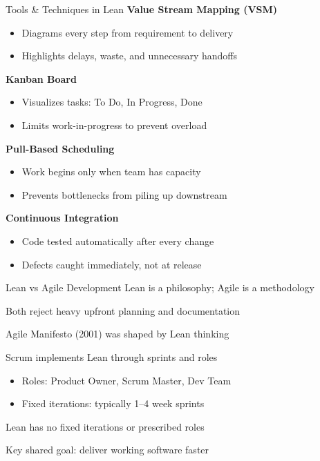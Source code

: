 \documentclass{thapathali}
\begin{document}

\begin{frame}{Tools \& Techniques in Lean}
    \textbf{Value Stream Mapping (VSM)}
    \begin{itemize}
        \item Diagrams every step from requirement to delivery
        \item Highlights delays, waste, and unnecessary handoffs
    \end{itemize}
    \vspace{0.3em}
    
    \textbf{Kanban Board}
    \begin{itemize}
        \item Visualizes tasks: To Do, In Progress, Done
        \item Limits work-in-progress to prevent overload
    \end{itemize}
    \vspace{0.3em}
    
    \textbf{Pull-Based Scheduling}
    \begin{itemize}
        \item Work begins only when team has capacity
        \item Prevents bottlenecks from piling up downstream
    \end{itemize}
    \vspace{0.3em}
    
    \textbf{Continuous Integration}
    \begin{itemize}
        \item Code tested automatically after every change
        \item Defects caught immediately, not at release
    \end{itemize}
\end{frame}

\begin{frame}{Lean vs Agile Development}
    Lean is a philosophy; Agile is a methodology
    \vspace{0.3em}
    
    Both reject heavy upfront planning and documentation
    \vspace{0.3em}
    
    Agile Manifesto (2001) was shaped by Lean thinking
    \vspace{0.3em}
    
    Scrum implements Lean through sprints and roles
    \begin{itemize}
        \item Roles: Product Owner, Scrum Master, Dev Team
        \item Fixed iterations: typically 1--4 week sprints
    \end{itemize}
    \vspace{0.3em}
    Lean has no fixed iterations or prescribed roles
    \vspace{0.3em}
    
    Key shared goal: deliver working software faster
\end{frame}
\end{document}
